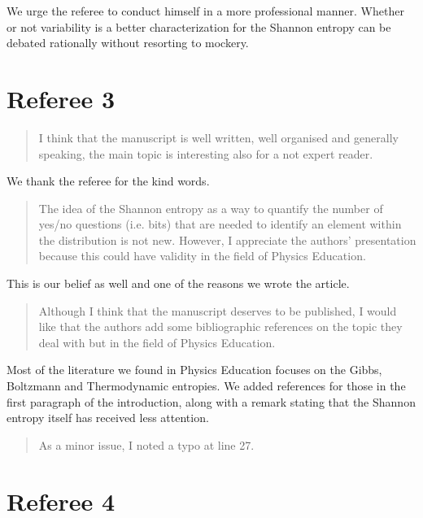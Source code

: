 \documentclass[11pt]{article}
\begin{document}
We urge the referee to conduct himself in a more professional manner. Whether or not variability is a better characterization for the Shannon entropy can be debated rationally without resorting to mockery.

\section*{Referee 3}

\begin{quote}
	I think that the manuscript is well written, well organised and generally speaking, the main topic is interesting also for a not expert reader. 
\end{quote}

We thank the referee for the kind words.

\begin{quote}
The idea of the Shannon entropy as a way to quantify the number of yes/no questions (i.e. bits) that are needed to identify an element within the distribution is not new. However, I appreciate the authors' presentation because this could have validity in the field of Physics Education.
\end{quote}

This is our belief as well and one of the reasons we wrote the article.

\begin{quote}
Although I think that the manuscript deserves to be published, I would like that the authors add some bibliographic references on the topic they deal with but in the field of Physics Education.
\end{quote}

Most of the literature we found in Physics Education focuses on the Gibbs, Boltzmann and Thermodynamic entropies. We added references for those in the first paragraph of the introduction, along with a remark stating that the Shannon entropy itself has received less attention.

\begin{quote}
As a minor issue, I noted a typo at line 27.
\end{quote}


\section*{Referee 4}
\end{document}
